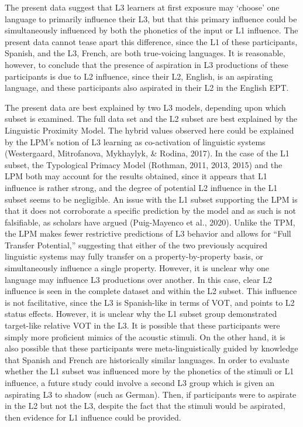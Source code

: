 \documentclass[
  english,
  man]{apa6}
\begin{document}
The present data suggest that L3 learners at first exposure may `choose' one language to primarily influence their L3, but that this primary influence could be simultaneously influenced by both the phonetics of the input or L1 influence.
The present data cannot tease apart this difference, since the L1 of these participants, Spanish, and the L3, French, are both true-voicing languages.
It is reasonable, however, to conclude that the presence of aspiration in L3 productions of these participants is due to L2 influence, since their L2, English, is an aspirating language, and these participants also aspirated in their L2 in the English EPT.

The present data are best explained by two L3 models, depending upon which subset is examined. The full data set and the L2 subset are best explained by the Linguistic Proximity Model.
The hybrid values observed here could be explained by the LPM's notion of L3 learning as co-activation of linguistic systems (Westergaard, Mitrofanova, Mykhaylyk, \& Rodina, 2017).
In the case of the L1 subset, the Typological Primacy Model (Rothman, 2011, 2013, 2015) and the LPM both may account for the results obtained, since it appears that L1 influence is rather strong, and the degree of potential L2 influence in the L1 subset seems to be negligible.
An issue with the L1 subset supporting the LPM is that it does not corroborate a specific prediction by the model and as such is not falsifiable, as scholars have argued (Puig-Mayenco et al., 2020).
Unlike the TPM, the LPM makes fewer restrictive predictions of L3 behavior and allows for ``Full Transfer Potential,'' suggesting that either of the two previously acquired linguistic systems may fully transfer on a property-by-property basis, or simultaneously influence a single property.
However, it is unclear why one language may influence L3 productions over another. In this case, clear L2 influence is seen in the complete dataset and within the L2 subset.
This influence is not facilitative, since the L3 is Spanish-like in terms of VOT, and points to L2 status effects.
However, it is unclear why the L1 subset group demonstrated target-like relative VOT in the L3. It is possible that these participants were simply more proficient mimics of the acoustic stimuli.
On the other hand, it is also possible that these participants were meta-linguistically guided by knowledge that Spanish and French are historically similar languages.
In order to evaluate whether the L1 subset was influenced more by the phonetics of the stimuli or L1 influence, a future study could involve a second L3 group which is given an aspirating L3 to shadow (such as German).
Then, if participants were to aspirate in the L2 but not the L3, despite the fact that the stimuli would be aspirated, then evidence for L1 influence could be provided.
\end{document}
